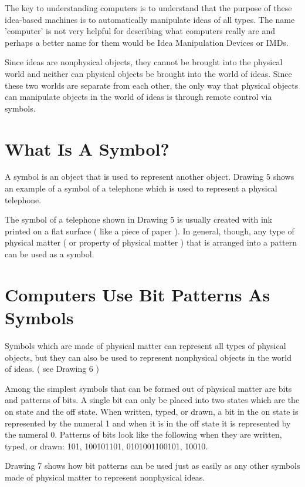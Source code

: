 \documentclass[12pt,oneside]{book}
\begin{document}
The key to understanding computers is to understand that the purpose of these idea{}-based machines is to automatically manipulate ideas of all types. The name 'computer' is not very helpful for describing what computers really are and perhaps a better name for them would be Idea Manipulation Devices or IMDs. 

Since ideas are nonphysical objects, they cannot be brought into the physical world and neither can physical objects be brought into the world of ideas. Since these two worlds are separate from each other, the only way that physical objects can manipulate objects in the world of ideas is through remote control via symbols.

\section[What Is A Symbol?]{What Is A Symbol?}

A symbol is an object that is used to represent another object. Drawing 5 shows an example of a symbol of a telephone which is used to represent a physical telephone. 

The symbol of a telephone shown in Drawing 5 is usually created with ink printed on a flat surface ( like a piece of paper ). In general, though, any type of physical matter ( or property of physical matter ) that is arranged into a pattern can be used as a symbol.

\section[Computers Use Bit Patterns As Symbols]{ Computers Use Bit Patterns As Symbols}

Symbols which are made of physical matter can represent all types of physical objects, but they can also be used to represent nonphysical objects in the world of ideas. ( see Drawing 6 ) 


Among the simplest symbols that can be formed out of physical matter are bits and patterns of bits. A single bit can only be placed into two states which are the on state and the off state. When written, typed, or drawn, a bit in the on state is represented by the numeral 1 and when it is in the off state it is represented by the numeral 0. Patterns of bits look like the following when they are written, typed, or drawn: 101, 100101101, 0101001100101, 10010. 

Drawing 7 shows how bit patterns can be used just as easily as any other symbols made of physical matter to represent nonphysical ideas. 
\end{document}
